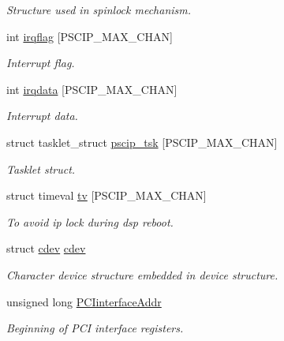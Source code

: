 \begin{CompactItemize}
\begin{CompactList}\small\item\em Structure used in spinlock mechanism. \item\end{CompactList}\item 
int \hyperlink{structnpscip___dev_267da34d5acdd2acaf2af946707736f1}{irqflag} \mbox{[}PSCIP\_\-MAX\_\-CHAN\mbox{]}
\begin{CompactList}\small\item\em Interrupt flag. \item\end{CompactList}\item 
int \hyperlink{structnpscip___dev_2d77c2f8b559f45698716fd09adf4786}{irqdata} \mbox{[}PSCIP\_\-MAX\_\-CHAN\mbox{]}
\begin{CompactList}\small\item\em Interrupt data. \item\end{CompactList}\item 
struct tasklet\_\-struct \hyperlink{structnpscip___dev_136ae19fbe301b0bfcf3d143e59e7bed}{pscip\_\-tsk} \mbox{[}PSCIP\_\-MAX\_\-CHAN\mbox{]}
\begin{CompactList}\small\item\em Tasklet struct. \item\end{CompactList}\item 
struct timeval \hyperlink{structnpscip___dev_30bb89cf1d7aed16f8ebacc55f6ded2e}{tv} \mbox{[}PSCIP\_\-MAX\_\-CHAN\mbox{]}
\begin{CompactList}\small\item\em To avoid ip lock during dsp reboot. \item\end{CompactList}\item 
struct \hyperlink{structnpscip___dev_4990eb4f37675360d8207ff38e6616a3}{cdev} \hyperlink{structnpscip___dev_4990eb4f37675360d8207ff38e6616a3}{cdev}
\begin{CompactList}\small\item\em Character device structure embedded in device structure. \item\end{CompactList}\item 
unsigned long \hyperlink{structnpscip___dev_e8a93765bbde1cad3218f1611d6ae623}{PCIinterfaceAddr}
\begin{CompactList}\small\item\em Beginning of PCI interface registers. \item\end{CompactList}\item 

\end{CompactItemize}
